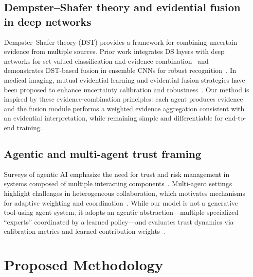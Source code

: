 \documentclass[10pt]{article}
\begin{document}
\subsection{Dempster--Shafer theory and evidential fusion in deep networks}
Dempster--Shafer theory (DST) provides a framework for combining uncertain evidence from multiple sources. Prior work integrates DS layers with deep networks for set-valued classification and evidence combination~\cite{tong2021} and demonstrates DST-based fusion in ensemble CNNs for robust recognition~\cite{yaghoubi2021}. In medical imaging, mutual evidential learning and evidential fusion strategies have been proposed to enhance uncertainty calibration and robustness~\cite{he2025}. Our method is inspired by these evidence-combination principles: each agent produces evidence and the fusion module performs a weighted evidence aggregation consistent with an evidential interpretation, while remaining simple and differentiable for end-to-end training.

\subsection{Agentic and multi-agent trust framing}
Surveys of agentic AI emphasize the need for trust and risk management in systems composed of multiple interacting components~\cite{raza2025,ali2025agentic}. Multi-agent settings highlight challenges in heterogeneous collaboration, which motivates mechanisms for adaptive weighting and coordination~\cite{feng2025}. While our model is not a generative tool-using agent system, it adopts an agentic abstraction---multiple specialized ``experts'' coordinated by a learned policy---and evaluates trust dynamics via calibration metrics and learned contribution weights~\cite{raza2025}.

\section{Proposed Methodology}
\label{sec:method}
\end{document}
